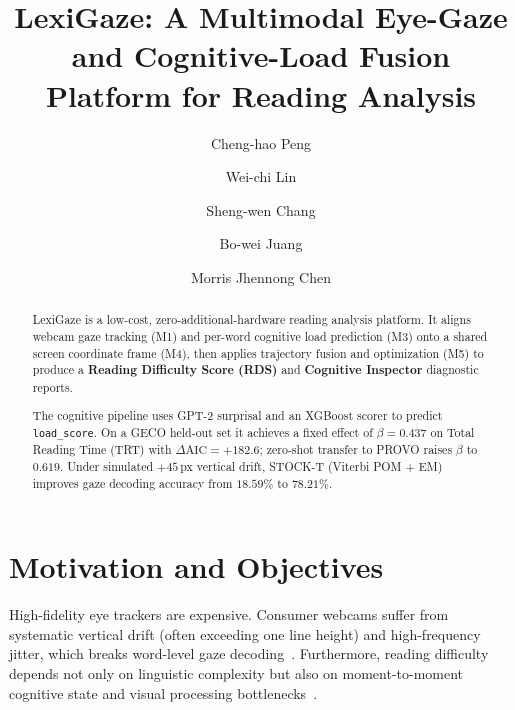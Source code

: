 \documentclass[sigconf]{acmart}
\begin{document}
\title{LexiGaze: A Multimodal Eye-Gaze and Cognitive-Load Fusion Platform for Reading Analysis}

\author{Cheng-hao Peng}
\email{}

\author{Wei-chi Lin}
\email{}

\author{Sheng-wen Chang}
\email{}

\author{Bo-wei Juang}
\email{}

\author{Morris Jhennong Chen}
\email{}

\begin{abstract}
LexiGaze is a low-cost, zero-additional-hardware reading analysis platform. It aligns webcam gaze tracking (M1) and per-word cognitive load prediction (M3) onto a shared screen coordinate frame (M4), then applies trajectory fusion and optimization (M5) to produce a \textbf{Reading Difficulty Score (RDS)} and \textbf{Cognitive Inspector} diagnostic reports.

The cognitive pipeline uses GPT-2 surprisal and an XGBoost scorer to predict \texttt{load\_score}. On a GECO held-out set it achieves a fixed effect of $\beta = 0.437$ on Total Reading Time (TRT) with $\Delta\text{AIC} = +182.6$; zero-shot transfer to PROVO raises $\beta$ to $0.619$. Under simulated $+45$\,px vertical drift, STOCK-T (Viterbi POM + EM) improves gaze decoding accuracy from $18.59\%$ to $78.21\%$.
\end{abstract}


\maketitle

\section{Motivation and Objectives}
High-fidelity eye trackers are expensive. Consumer webcams suffer from systematic vertical drift (often exceeding one line height) and high-frequency jitter, which breaks word-level gaze decoding~\cite{krafka2016eye, rayner1998eye}. Furthermore, reading difficulty depends not only on linguistic complexity but also on moment-to-moment cognitive state and visual processing bottlenecks~\cite{hale2001probabilistic, levy2008expectation}.
\end{document}
